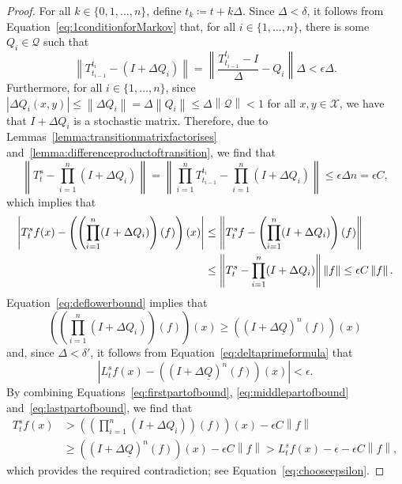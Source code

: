 \documentclass[a4paper,reqno]{amsart}
\newcommand{\states}{\mathcal{X}}
\newcommand{\lbound}{L}
\newcommand{\rateset}{\mathcal{Q}}
\newcommand{\lrate}{\underline{Q}}
\newcommand{\norm}[1]{\left\lVert #1 \right\rVert}
\newcommand{\abs}[1]{\left\vert #1 \right\vert}
\begin{document}
\begin{proof}
For all $k\in\{0,1,\dots,n\}$, define $t_k\coloneqq t+k\Delta$. Since $\Delta<\delta$, it follows from Equation~\eqref{eq:1conditionforMarkov} that, for all $i\in\{1,\dots,n\}$, there is some $Q_i\in\rateset$ such that 
\begin{equation*}
\norm{T_{t_{i-1}}^{t_i}-(I+\Delta Q_i)}
=\norm{\frac{T_{t_{i-1}}^{t_i}-I}{\Delta}-Q_i}\Delta
<\epsilon\Delta.
\end{equation*}
Furthermore, for all $i\in\{1,\dots,n\}$, since $\abs{\Delta Q_i(x,y)}\leq\norm{\Delta Q_i}=\Delta\norm{Q_i}\leq\Delta\norm{\rateset}<1$ for all $x,y\in\states$, we have that $I+\Delta Q_i$ is a stochastic matrix.
Therefore, due to Lemmas~\ref{lemma:transitionmatrixfactorises} and~\ref{lemma:differenceproductoftransition}, we find that
\begin{equation*}
\norm{T_t^s-\prod_{i=1}^n(I+\Delta Q_i)}
=\norm{\prod_{i=1}^n T_{t_{i-1}}^{t_i}-\prod_{i=1}^n(I+\Delta Q_i)}
\leq\epsilon\Delta n=\epsilon C,
\end{equation*}
which implies that
\begin{align}
\abs{T_t^sf(x)-\left(\left(\prod_{i=1}^n(I+\Delta Q_i)\right)(f)\right)(x)}
&\leq
\norm{T_t^sf-\left(\prod_{i=1}^n(I+\Delta Q_i)\right)(f)}\notag\\
&\leq
\norm{T_t^s-\prod_{i=1}^n(I+\Delta Q_i)}\norm{f}
\leq\epsilon C\norm{f}.\label{eq:firstpartofbound}
\end{align}
\noindent
Equation~\eqref{eq:deflowerbound} implies that
\begin{equation}
\left(\left(\prod_{i=1}^n(I+\Delta Q_i)\right)(f)\right)(x)
\geq
\left((I+\Delta\lrate)^n(f)\right)(x)\label{eq:middlepartofbound}
\end{equation}
and, since $\Delta<\delta'$, it follows from Equation~\eqref{eq:deltaprimeformula} that
\begin{equation}\label{eq:lastpartofbound}
\abs{\lbound_t^sf(x) - \left((I+\Delta\lrate)^n(f)\right)(x)}<\epsilon.
\end{equation}
\noindent
By combining Equations~\eqref{eq:firstpartofbound}, \eqref{eq:middlepartofbound} and~\eqref{eq:lastpartofbound}, we find that
\begin{align*}
T_t^sf(x)
&>
\left(\left(\prod_{i=1}^n(I+\Delta Q_i)\right)(f)\right)(x)-\epsilon C\norm{f}\\
&\geq
\left((I+\Delta\lrate)^n(f)\right)(x)-\epsilon C\norm{f}
>\lbound_t^sf(x)-\epsilon-\epsilon C\norm{f},
\end{align*}
which provides the required contradiction; see Equation~\eqref{eq:chooseepsilon}.
\end{proof}
\end{document}
